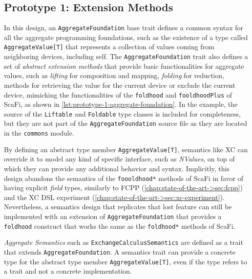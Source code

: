 \subsection{Prototype 1: Extension Methods} \label{chap:design->sec:dsl->subsec:prototype-1-extension-methods}

In this design, an \texttt{AggregateFoundation} base trait defines a common syntax for all the aggregate programming foundations, such as the existence of a type called \texttt{AggregateValue[T]} that represents a collection of values coming from neighboring devices, including self.
%
The \texttt{AggregateFoundation} trait also defines a set of \textit{abstract extension methods} that provide basic functionalities for aggregate values, such as \textit{lifting} for composition and mapping, \textit{folding} for reduction, methods for retrieving the value for the current device or exclude the current device, mimicking the functionalities of the \texttt{foldhood} and \texttt{fooldhoodPlus} of ScaFi, as shown in \cref{lst:prototype-1-aggregate-foundation}.
%
In the example, the source of the \texttt{Liftable} and \texttt{Foldable} type classes is included for completeness, but they are not part of the \texttt{AggregateFoundation} source file as they are located in the \texttt{commons} module.



By defining an abstract type member \texttt{AggregateValue[T]}, semantics like \ac{XC} can override it to model any kind of specific interface, such as \textit{NValues}, on top of which they can provide any additional behavior and syntax.
%
Implicitly, this design abandons the  semantics of the \texttt{foooldhood*} methods of ScaFi in favor of having explicit \textit{field} types, similarly to FCPP (\cref{chap:state-of-the-art->sec:fcpp}) and the \ac{XC} \ac{DSL} experiment (\cref{chap:state-of-the-art->sec:xc-experiment}).
%
Nevertheless, a semantics design that replicates that lost feature can still be implemented with an extension of \texttt{AggregateFoundation} that provides a \texttt{foldhood} construct that works the same as the \texttt{foldhood*} methods of ScaFi.

\textit{Aggregate Semantics} such as \texttt{ExchangeCalculusSemantics} are defined as a trait that extends \texttt{AggregateFoundation}.
%
A semantics trait can provide a concrete type for the abstract type member \texttt{AggregateValue[T]}, even if the type refers to a trait and not a concrete implementation.


